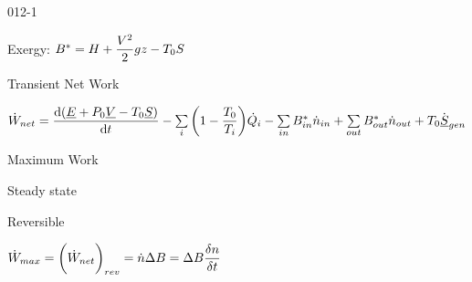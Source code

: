 \begin{mitframe}{012-1}

    
	\begin{listone}
	
    	\item Exergy:  $\exergy^{\ast}=\enthalpy+\dfrac{\vol^{2}}{2}\grav{z}-\Temp_0\entropy$
    
    	\begin{listtwo}
	
    		\item Transient Net Work
    		  
            \begin{listthree}
	
    			\item$\dot{\work}_{net}=\dfrac{\mathrm{d}(\uline{\energy}+\p_0\uline{\vol}-\Temp_0\uline{\entropy})}{\mathrm{d}t}-\sum\limits_{\state}\bigg(1-\dfrac{\Temp_0}{\Temp_{\state}}\bigg)\dot{\heatflow}_{\state}-\sum\limits_{in}\exergy_{in}^{\ast}\dot{n}_{in}+\sum\limits_{out}\exergy_{out}^{\ast}\dot{n}_{out}+\Temp_0\dot{\uline{\entropy}}_{gen}$
			\end{listthree}  
    		
            \item Maximum Work
    		  
            \begin{listthree}
	
    			\item Steady state
                
                \item Reversible
                
                \item$\dot{\work}_{max}=\bigg(\dot{\work}_{net}\bigg)_{rev}=\dot{n}\iipf\exergy=\iipf\exergy\dfrac{\blthick{n}}{\blthick{t}}$
    
			\end{listthree}                       
   		
        \end{listtwo}
    
	\end{listone}    

\end{mitframe}
